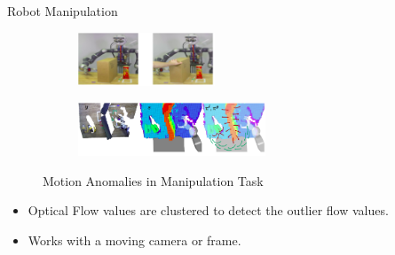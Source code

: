 \documentclass{beamer}
\begin{document}
\begin{frame}{Robot Manipulation}

\begin{figure}[]
	\centering     
	
	
	\begin{subfigure}[b]{0.5\textwidth}
		
		
			\centering
			\includegraphics[width= 0.75\linewidth, height = 1.6cm]{images/hand_manip.png}
			
	
	\end{subfigure}
	
	
	\begin{subfigure}[b]{0.5\textwidth}
		
			\centering
			\includegraphics[width= 0.85\linewidth, height = 1.6cm]{images/second_2.png}
			
		
	
	\end{subfigure}
	
	
	
	\caption{Motion Anomalies in Manipulation Task \cite{hand_manip_anom}   }\label{qmul_normal_pic} 
\setlength{\belowcaptionskip}{-20pt}	
\end{figure}


\begin{itemize}
\item Optical Flow values are clustered to detect the outlier flow values.
\item Works with a moving camera or frame.
\end{itemize}

\end{frame}
\end{document}
